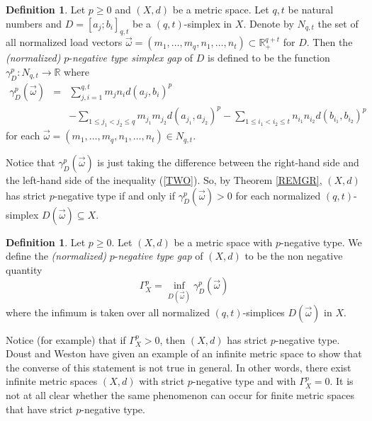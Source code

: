 \documentclass[10pt]{amsart}
\theoremstyle{definition}
\newtheorem{defn}[thm]{Definition}
\theoremstyle{remark}
\begin{document}
\begin{defn}\label{SGAP} Let $p \geq 0$ and $(X,d)$ be a metric space. Let $q,t$ be natural numbers and
$D=[a_{j};b_{i}]_{q,t}$ be a $(q,t)$-simplex in $X$. Denote by $N_{q,t}$
the set of all normalized load vectors $\vec{\omega}=
(m_{1}, \ldots , m_{q}, n_{1}, \ldots , n_{t}) \subset \mathbb{R}^{q+t}_{+}$ for $D$. Then
the \textit{(normalized)} $p$-\textit{negative type simplex gap} of $D$ is defined to be the
function $\gamma_{D}^{p} : N_{q,t} \rightarrow \mathbb{R}$ where
\begin{eqnarray*}
\gamma_{D}^{p}(\vec{\omega}) & = & \sum\limits_{j,i = 1}^{q,t} m_{j}n_{i}d(a_{j},b_{i})^{p} \\
& ~ & - \sum\limits_{1 \leq j_{1} < j_{2} \leq q} m_{j_{1}}m_{j_{2}}d(a_{j_{1}},a_{j_{2}})^{p}
- \sum\limits_{1 \leq i_{1} < i_{2} \leq t} n_{i_{1}}n_{i_{2}}d(b_{i_{1}},b_{i_{2}})^{p}
\end{eqnarray*}
for each $\vec{\omega}=(m_{1}, \ldots, m_{q}, n_{1}, \ldots, n_{t}) \in N_{q,t}$.
\end{defn}
\noindent Notice that $\gamma_{D}^{p}(\vec{\omega})$ is just taking the difference between the right-hand side
and the left-hand side of the inequality (\ref{TWO}). So, by Theorem \ref{REMGR}, $(X,d)$ has
strict $p$-negative type if and only if $\gamma_{D}^{p}(\vec{\omega}) > 0$ for each normalized
$(q,t)$-simplex $D(\vec{\omega}) \subseteq X$.

\begin{defn}\label{NGAP} Let $p \geq 0$.
Let $(X,d)$ be a metric space with $p$-negative type. We define the
\textit{(normalized)} $p$-\textit{negative type gap} of $(X,d)$
to be the non negative quantity $$\Gamma_{X}^{p} = \inf\limits_{D(\vec{\omega})} \gamma_{D}^{p}(\vec{\omega})$$
where the infimum is taken over all normalized $(q,t)$-simplices $D(\vec{\omega})$ in $X$.
\end{defn}
\noindent Notice (for example) that if $\Gamma_{X}^{p} > 0$, then $(X,d)$ has strict $p$-negative type.
Doust and Weston \cite{DW} have given an example of an infinite metric space to show that the converse
of this statement is not true in general. In other words, there exist infinite metric spaces $(X,d)$ with strict
$p$-negative type and with $\Gamma_{X}^{p} = 0$. It is not at all clear whether the same phenomenon can
occur for finite metric spaces that have strict $p$-negative type.
\end{document}
